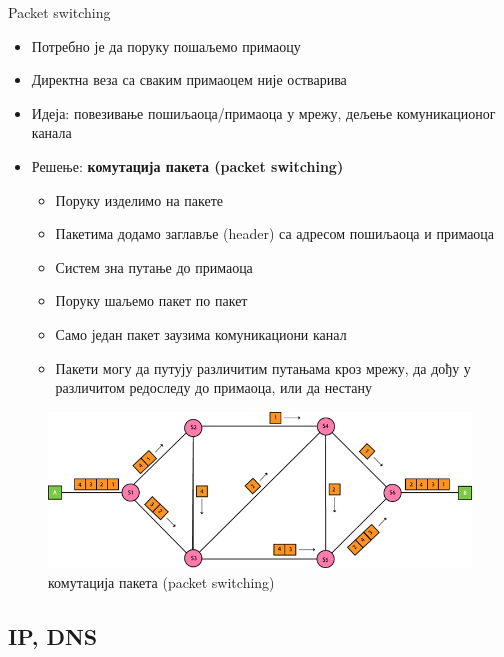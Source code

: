 \documentclass{beamer}
\begin{document}
    \begin{frame}[allowframebreaks]{Packet switching}
        \begin{itemize}
            \item Потребно је да поруку пошаљемо примаоцу
            \item Директна веза са сваким примаоцем није остварива
            \item Идеја: повезивање пошиљаоца/примаоца у мрежу, дељење комуникационог канала
            \item Решење: \textbf{комутација пакета (packet switching)}
            \begin{itemize}
                \item Поруку изделимо на пакете
                \item Пакетима додамо заглавље (header) са адресом пошиљаоца и примаоца
                \item Систем зна путање до примаоца
                \item Поруку шаљемо пакет по пакет
                \item Само један пакет заузима комуникациони канал
                \item Пакети могу да путују различитим путањама кроз мрежу, да дођу у различитом редоследу до примаоца, или да нестану
            \end{itemize}
        \end{itemize}

        \framebreak

        \begin{figure}
            \centering
            \includegraphics[width=\textwidth,height=0.8\textheight,keepaspectratio]{images/pcsw.png}
            \caption{комутација пакета (packet switching)}
            \label{fig:pcsw}
        \end{figure}
    \end{frame}

    \subsection{IP, DNS}
\end{document}
